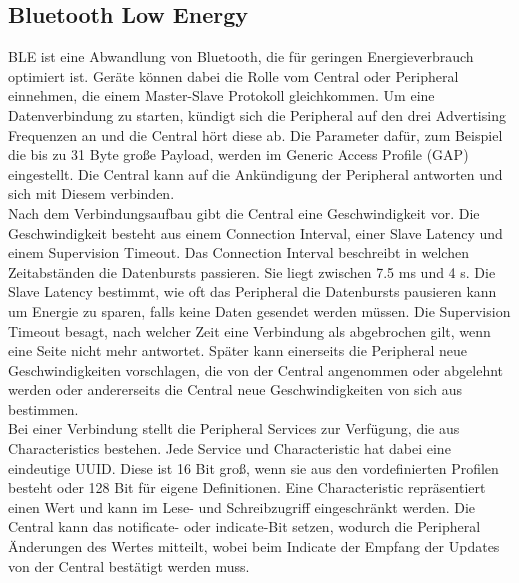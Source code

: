 \subsection{Bluetooth Low Energy}
BLE ist eine Abwandlung von Bluetooth, die für geringen Energieverbrauch optimiert ist.
Geräte können dabei die Rolle vom Central oder Peripheral einnehmen, die einem Master-Slave Protokoll gleichkommen.
Um eine Datenverbindung zu starten, kündigt sich die Peripheral auf den drei Advertising Frequenzen an und die Central hört diese ab.
Die Parameter dafür, zum Beispiel die bis zu 31 Byte große Payload, werden im Generic Access Profile (GAP) eingestellt.
Die Central kann auf die Ankündigung der Peripheral antworten und sich mit Diesem verbinden. \cite{site_adabt}\\
Nach dem Verbindungsaufbau gibt die Central eine Geschwindigkeit vor.
Die Geschwindigkeit besteht aus einem Connection Interval, einer Slave Latency und einem Supervision Timeout.
Das Connection Interval beschreibt in welchen Zeitabständen die Datenbursts passieren.
Sie liegt zwischen 7.5 ms und 4 s.
Die Slave Latency bestimmt, wie oft das Peripheral die Datenbursts pausieren kann um Energie zu sparen, falls keine Daten gesendet werden müssen.
Die Supervision Timeout besagt, nach welcher Zeit eine Verbindung als abgebrochen gilt, wenn eine Seite nicht mehr antwortet.
Später kann einerseits die Peripheral neue Geschwindigkeiten vorschlagen, die von der Central angenommen oder abgelehnt werden oder andererseits die Central neue Geschwindigkeiten von sich aus bestimmen. \cite{site_tigap}\\
Bei einer Verbindung stellt die Peripheral Services zur Verfügung, die aus Characteristics bestehen.
Jede Service und Characteristic hat dabei eine eindeutige UUID.
Diese ist 16 Bit groß, wenn sie aus den vordefinierten Profilen besteht oder 128 Bit für eigene Definitionen.
Eine Characteristic repräsentiert einen Wert und kann im Lese- und Schreibzugriff eingeschränkt werden.
Die Central kann das notificate- oder indicate-Bit setzen, wodurch die Peripheral Änderungen des Wertes mitteilt, wobei beim Indicate der Empfang der Updates von der Central bestätigt werden muss. \cite{site_norChara}\\

